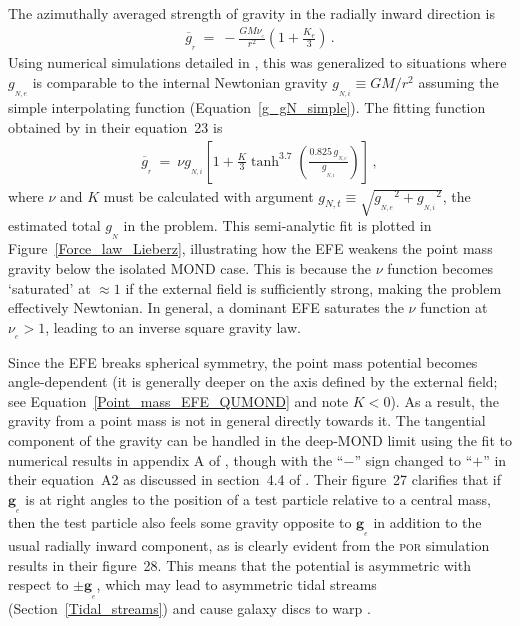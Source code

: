 \documentclass[fleqn,usenatbib,useAMS,onecolumn]{mnras} %
\begin{document}
The azimuthally averaged strength of gravity in the radially inward direction is
\begin{eqnarray}
	\overline{g}_{_r} ~=~ -\frac{GM\nu_{_e}}{r^2} \left( 1 + \frac{K_e}{3} \right) \, .
	\label{Angle_averaged_force_EFE_domination}
\end{eqnarray}
Using numerical simulations detailed in \citet{Banik_2018_Centauri}, this was generalized to situations where $g_{_{N,e}}$ is comparable to the internal Newtonian gravity $g_{_{N,i}} \equiv GM/r^2$ assuming the simple interpolating function (Equation~\ref{g_gN_simple}). The fitting function obtained by \citet{Zonoozi_2021} in their equation~23 is
\begin{eqnarray}
	\overline{g}_{_r} ~=~ \nu g_{_{N,i}} \left[ 1 + \frac{K}{3}\tanh^{3.7} \left( \frac{0.825 \, g_{_{N,e}}}{g_{_{N,i}}} \right) \right] \, ,
	\label{Lieberz_fit}
\end{eqnarray}
where $\nu$ and $K$ must be calculated with argument $g_{N,t} \equiv \sqrt{{g_{_{N,e}}}^2 + {g_{_{N,i}}}^2}$, the estimated total $g_{_N}$ in the problem. This semi-analytic fit is plotted in Figure~\ref{Force_law_Lieberz}, illustrating how the EFE weakens the point mass gravity below the isolated MOND case. This is because the $\nu$ function becomes `saturated' at $\approx 1$ if the external field is sufficiently strong, making the problem effectively Newtonian. In general, a dominant EFE saturates the $\nu$ function at $\nu_{_e} > 1$, leading to an inverse square gravity law.

Since the EFE breaks spherical symmetry, the point mass potential becomes angle-dependent (it is generally deeper on the axis defined by the external field; see Equation~\ref{Point_mass_EFE_QUMOND} and note $K < 0$). As a result, the gravity from a point mass is not in general directly towards it. The tangential component of the gravity can be handled in the deep-MOND limit using the fit to numerical results in appendix A of \citet{Banik_Ryan_2018}, though with the ``$-$'' sign changed to ``$+$'' in their equation~A2 as discussed in section~4.4 of \citet{Banik_2020_M33}. Their figure~27 clarifies that if $\bm{g}_{_e}$ is at right angles to the position of a test particle relative to a central mass, then the test particle also feels some gravity opposite to $\bm{g}_{_e}$ in addition to the usual radially inward component, as is clearly evident from the \textsc{por} simulation results in their figure~28. This means that the potential is asymmetric with respect to $\pm \bm{g}_{_e}$, which may lead to asymmetric tidal streams (Section~\ref{Tidal_streams}) and cause galaxy discs to warp \citep{Brada_2000_warp, Banik_2020_M33}.
\end{document}
